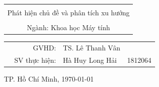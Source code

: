 \begin{titlepage}
\begin{center}
\begin{tabular}{c}
\hline
\\
{\Huge Phát hiện chủ đề và phân tích xu hướng}
\\[1.5em]
\hline

\\
{\large Ngành: \space Khoa học Máy tính }


\end{tabular}
\end{center}

\vspace{1cm}

\begin{table}[h]
\begin{tabular}{rrlr}
\hspace{2.9 cm} &  GVHD: &TS. Lê Thanh Vân \\

& SV thực hiện: &Hà Huy Long Hải         &1812064 \\

\end{tabular}
\end{table}

\vfill
\begin{center}
{TP. Hồ Chí Minh, \today }
\end{center}
\end{titlepage}
\thispagestyle{empty}
